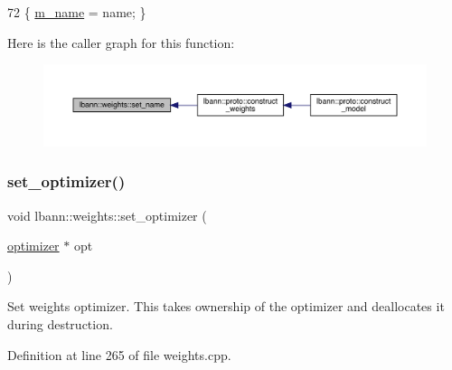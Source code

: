 \begin{DoxyCode}
72 \{ \hyperlink{classlbann_1_1weights_a08abf0bb29aa47be21bfc7473b4b9b99}{m\_name} = name; \}
\end{DoxyCode}
Here is the caller graph for this function\+:\nopagebreak
\begin{figure}[H]
\begin{center}
\leavevmode
\includegraphics[width=350pt]{classlbann_1_1weights_ab886e4d3ff62b62a7ac6c52e391666f2_icgraph}
\end{center}
\end{figure}
\mbox{\label{classlbann_1_1weights_ab641f66c09c8b5d491c0f262e8cb55e6}} 
\subsubsection{\texorpdfstring{set\+\_\+optimizer()}{set\_optimizer()}}
{\footnotesize\ttfamily void lbann\+::weights\+::set\+\_\+optimizer (\begin{DoxyParamCaption}\item[{\hyperlink{classlbann_1_1optimizer}{optimizer} $\ast$}]{opt }\end{DoxyParamCaption})}

Set weights optimizer. This takes ownership of the optimizer and deallocates it during destruction. 

Definition at line 265 of file weights.\+cpp.


